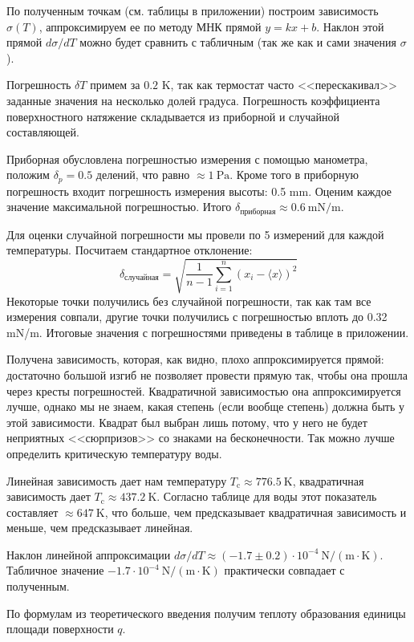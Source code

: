 \documentclass[a4paper,12pt]{report}
\begin{document}
\begin{multicols}{2}
        По полученным точкам (см. таблицы в приложении) построим зависимость $\sigma(T)$, аппроксимируем ее по методу МНК прямой $y=kx+b$. Наклон этой прямой $d\sigma/dT$ можно будет сравнить с табличным (так же как и сами значения $\sigma$).

        Погрешность $\delta T$ примем за $0.2$ K, так как термостат часто <<перескакивал>> заданные значения на несколько долей градуса. Погрешность коэффициента поверхностного натяжение складывается из приборной и случайной составляющей.
        
        Приборная обусловлена погрешностью измерения с помощью манометра, положим $\delta_p=0.5$ делений, что равно $\approx 1 \ \text{Pa}$. Кроме того в приборную погрешность входит погрешность измерения высоты: 0.5 mm. Оценим каждое значение максимальной погрешностью. Итого $\delta_\text{приборная}\approx 0.6 \ \text{mN}/\text{m}$.

        Для оценки случайной погрешности мы провели по 5 измерений для каждой температуры. Посчитаем стандартное отклонение:
        \begin{equation*}
            \delta_\text{случайная}=\sqrt{\frac{1}{n-1}\sum_{i=1}^{n}(x_i-\langle x \rangle)^2}
        \end{equation*}
        Некоторые точки получились без случайной погрешности, так как там все измерения совпали, другие точки получились с погрешностью вплоть до 0.32 mN/m. Итоговые значения с погрешностями приведены в таблице в приложении.

        
        Получена зависимость, которая, как видно, плохо аппроксимируется прямой: достаточно большой изгиб не позволяет провести прямую так, чтобы она прошла через кресты погрешностей. Квадратичной зависимостью она аппроксимируется лучше, однако мы не знаем, какая степень (если вообще степень) должна быть у этой зависимости. Квадрат был выбран лишь потому, что у него не будет неприятных <<сюрпризов>> со знаками на бесконечности. Так можно лучше определить критическую температуру воды.

        Линейная зависимость дает нам температуру $T_\text{c}\approx 776.5 \ \text{K}$, квадратичная зависимость дает $T_\text{c}\approx 437.2 \ \text{K}$. Согласно таблице для воды этот показатель составляет $\approx 647 \ \text{K}$, что больше, чем предсказывает квадратичная зависимость и меньше, чем предсказывает линейная.

        Наклон линейной аппроксимации $d\sigma/dT\approx (-1.7\pm0.2)\cdot 10^{-4} \ \text{N}/(\text{m}\cdot\text{K})$. Табличное значение $-1.7\cdot 10^{-4}\ \text{N}/(\text{m}\cdot \text{K})$ практически совпадает с полученным.

        По формулам из теоретического введения получим теплоту образования единицы площади поверхности $q$.

    \end{multicols}
\end{document}
